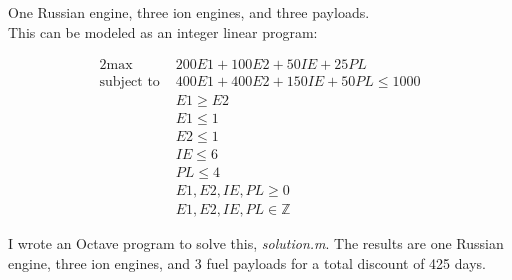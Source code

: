 \documentclass{article}
\begin{document}
\noindent One Russian engine, three ion engines, and three payloads.\\
This can be modeled as an integer linear program:

\begin{alignat*}{2}
    \text{max } & 200E1 + 100E2 + 50IE + 25PL\\
        \text{subject to } & 400E1 + 400E2 + 150IE + 50PL \leq 1000\\
    & E1 \geq E2\\
    & E1 \leq 1\\
    & E2 \leq 1\\
    & IE \leq 6\\
    & PL \leq 4\\
    & E1, E2, IE, PL \geq 0\\
    & E1, E2, IE, PL \in \mathbb{Z}
\end{alignat*}

\noindent I wrote an Octave program to solve this, \emph{solution.m}. The results are one Russian engine, three ion engines, and 3 fuel payloads for a total discount of 425 days.
\end{document}

